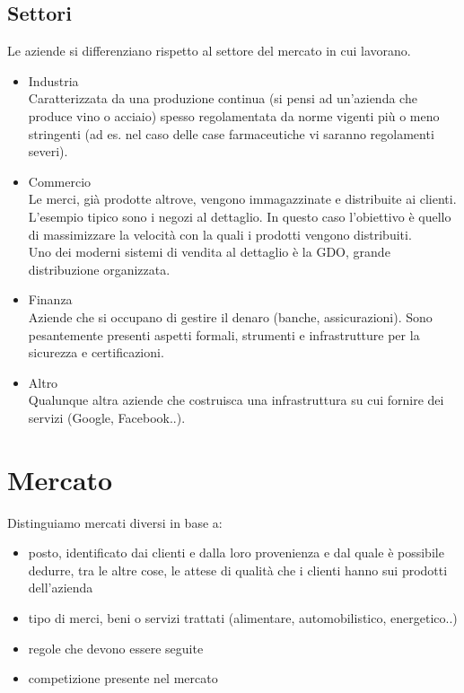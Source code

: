 \subsection{Settori}
Le aziende si differenziano rispetto al settore del mercato in cui lavorano.
\begin{itemize}
\item Industria \\
			Caratterizzata da una produzione continua (si pensi ad un'azienda che produce vino o acciaio) spesso regolamentata da norme vigenti pi\`u o meno stringenti (ad es. nel caso delle case farmaceutiche vi saranno regolamenti severi).
\item Commercio \\
			Le merci, gi\`a prodotte altrove, vengono immagazzinate e distribuite ai clien\-ti. L'esempio tipico sono i negozi al dettaglio. In questo caso l'obiettivo \`e quello di massimizzare la velocit\`a con la quali i prodotti vengono distribuiti. \\
Uno dei moderni sistemi di vendita al dettaglio \`e la \textsf{GDO}, grande distribuzione organizzata.
\item Finanza \\
			Aziende che si occupano di gestire il denaro (banche, assicurazioni). Sono pesantemente presenti aspetti formali, strumenti e infrastrutture per la sicurezza e certificazioni.
\item Altro \\
			Qualunque altra aziende che costruisca una infrastruttura su cui fornire dei servizi (Google, Facebook..).
\end{itemize}

\section{Mercato}
Distinguiamo mercati diversi in base a:
\begin{itemize}
\item posto, identificato dai clienti e dalla loro provenienza e dal quale \`e possibile dedurre, tra le altre cose, le attese di qualit\`a che i clienti hanno sui prodotti dell'azienda
\item tipo di merci, beni o servizi trattati (alimentare, automobilistico, energetico..)
\item regole che devono essere seguite
\item competizione presente nel mercato
\end{itemize}

